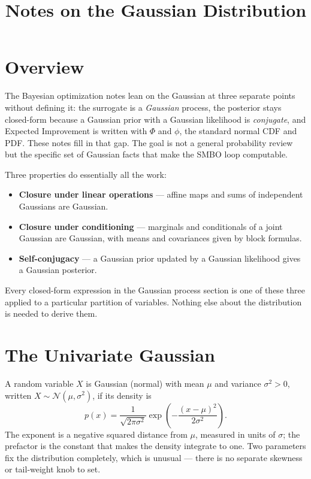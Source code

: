 \documentclass[conference]{IEEEtran}
\title{Notes on the Gaussian Distribution}
\author{
\IEEEauthorblockN{Luis Mendez}
}
\begin{document}
\maketitle

\section*{Overview}
The Bayesian optimization notes lean on the Gaussian at three separate points without defining it: the surrogate is a \textit{Gaussian} process, the posterior stays closed-form because a Gaussian prior with a Gaussian likelihood is \textit{conjugate}, and Expected Improvement is written with $\Phi$ and $\phi$, the standard normal CDF and PDF. These notes fill in that gap. The goal is not a general probability review but the specific set of Gaussian facts that make the SMBO loop computable.

Three properties do essentially all the work:
\begin{itemize}
    \item \textbf{Closure under linear operations} --- affine maps and sums of independent Gaussians are Gaussian.
    \item \textbf{Closure under conditioning} --- marginals and conditionals of a joint Gaussian are Gaussian, with means and covariances given by block formulas.
    \item \textbf{Self-conjugacy} --- a Gaussian prior updated by a Gaussian likelihood gives a Gaussian posterior.
\end{itemize}
Every closed-form expression in the Gaussian process section is one of these three applied to a particular partition of variables. Nothing else about the distribution is needed to derive them.

\section*{The Univariate Gaussian}
A random variable $X$ is Gaussian (normal) with mean $\mu$ and variance $\sigma^2 > 0$, written $X \sim \mathcal{N}(\mu, \sigma^2)$, if its density is
\begin{equation}
    p(x) = \frac{1}{\sqrt{2\pi\sigma^2}}\exp\!\left(-\frac{(x-\mu)^2}{2\sigma^2}\right).
\end{equation}
The exponent is a negative squared distance from $\mu$, measured in units of $\sigma$; the prefactor is the constant that makes the density integrate to one. Two parameters fix the distribution completely, which is unusual --- there is no separate skewness or tail-weight knob to set.
\end{document}
